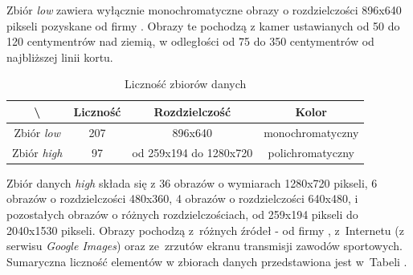 Zbiór \textit{low} zawiera wyłącznie monochromatyczne obrazy o rozdzielczości 896x640 pikseli pozyskane od firmy \blue{}. Obrazy te pochodzą z kamer ustawianych od 50 do 120 centymentrów nad ziemią, w odległości od 75 do 350 centymentrów od najbliższej linii kortu.

\begin{table}[!h]
	\centering
	\caption{Liczność zbiorów danych}
	\vspace{6pt}
	{\footnotesize
		\begin{tabular}{|c|c|c|c|}
			\hline \textbackslash & Liczność & Rozdzielczość & Kolor \\
      \hline Zbiór \textit{low} & 207 & 896x640 & monochromatyczny \\
      \hline Zbiór \textit{high} & 97 & od 259x194 do 1280x720 & polichromatyczny \\
      \hline
    \end{tabular}
    \label{Tab:licznosc}
	}
	\vspace{0pt}
\end{table}

Zbiór danych \textit{high} składa się z 36 obrazów o wymiarach 1280x720 pikseli, 6 obrazów o rozdzielczości 480x360, 4 obrazów o rozdzielczości 640x480, i pozostałych obrazów o różnych rozdzielczościach, od 259x194 pikseli do 2040x1530 pikseli. Obrazy pochodzą z~różnych źródeł - od firmy \blue{}, z~Internetu (z serwisu \textit{Google Images}) oraz ze~zrzutów ekranu transmisji zawodów sportowych. Sumaryczna liczność elementów w zbiorach danych przedstawiona jest w~Tabeli .
